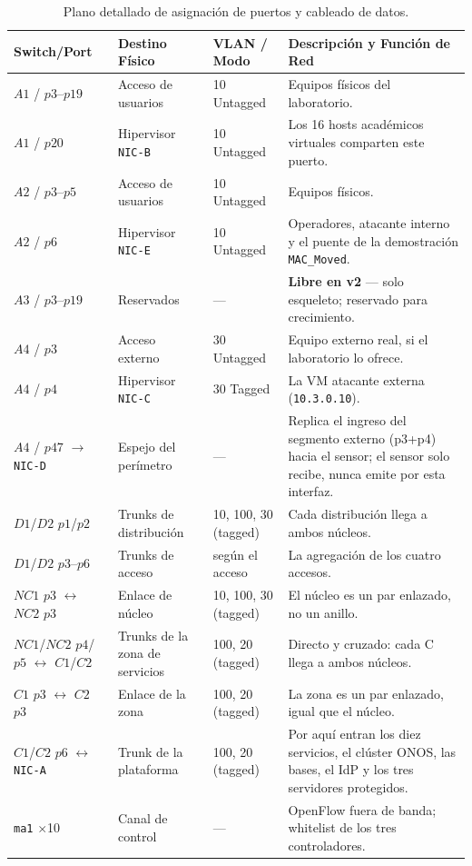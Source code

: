 \documentclass[11pt,a4paper]{report}
\begin{document}
\begin{table}[h!]
\centering
\small
\begin{tabularx}{\linewidth}{p{1.8cm}p{3.2cm}p{2.5cm}X}
\toprule
\textbf{Switch/Port} & \textbf{Destino Físico} & \textbf{VLAN / Modo} & \textbf{Descripción y Función de Red} \\
\midrule
$A1$ / $p3$--$p19$ & Acceso de usuarios & 10 Untagged & Equipos físicos del laboratorio. \\
$A1$ / $p20$ & Hipervisor \texttt{NIC-B} & 10 Untagged & Los 16 hosts académicos virtuales comparten este puerto. \\
$A2$ / $p3$--$p5$ & Acceso de usuarios & 10 Untagged & Equipos físicos. \\
$A2$ / $p6$ & Hipervisor \texttt{NIC-E} & 10 Untagged & Operadores, atacante interno y el puente de la demostración \texttt{MAC\_Moved}. \\
$A3$ / $p3$--$p19$ & Reservados & --- & \textbf{Libre en v2} — solo esqueleto; reservado para crecimiento. \\
$A4$ / $p3$ & Acceso externo & 30 Untagged & Equipo externo real, si el laboratorio lo ofrece. \\
$A4$ / $p4$ & Hipervisor \texttt{NIC-C} & 30 Tagged & La VM atacante externa (\texttt{10.3.0.10}). \\
$A4$ / $p47$ $\rightarrow$ \texttt{NIC-D} & Espejo del perímetro & --- & Replica el ingreso del segmento externo (p3+p4) hacia el sensor; el sensor solo recibe, nunca emite por esta interfaz. \\
$D1$/$D2$ $p1$/$p2$ & Trunks de distribución & 10, 100, 30 (tagged) & Cada distribución llega a ambos núcleos. \\
$D1$/$D2$ $p3$--$p6$ & Trunks de acceso & según el acceso & La agregación de los cuatro accesos. \\
$NC1$ $p3$ $\leftrightarrow$ $NC2$ $p3$ & Enlace de núcleo & 10, 100, 30 (tagged) & El núcleo es un par enlazado, no un anillo. \\
$NC1$/$NC2$ $p4$/$p5$ $\leftrightarrow$ $C1$/$C2$ & Trunks de la zona de servicios & 100, 20 (tagged) & Directo y cruzado: cada C llega a ambos núcleos. \\
$C1$ $p3$ $\leftrightarrow$ $C2$ $p3$ & Enlace de la zona & 100, 20 (tagged) & La zona es un par enlazado, igual que el núcleo. \\
$C1$/$C2$ $p6$ $\leftrightarrow$ \texttt{NIC-A} & Trunk de la plataforma & 100, 20 (tagged) & Por aquí entran los diez servicios, el clúster ONOS, las bases, el IdP y los tres servidores protegidos. \\
\texttt{ma1} $\times$10 & Canal de control & --- & OpenFlow fuera de banda; whitelist de los tres controladores. \\
\bottomrule
\end{tabularx}
\caption{Plano detallado de asignación de puertos y cableado de datos.}
\label{tab:puertos}
\end{table}
\end{document}
